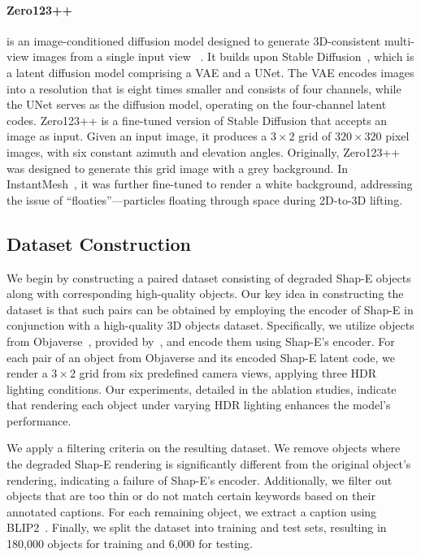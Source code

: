\paragraph{Zero123++}
is an image-conditioned diffusion model designed to generate 3D-consistent multi-view images from a single input view~\cite{shi2023zero123singleimageconsistent}
. It builds upon Stable Diffusion~\cite{rombach2022highresolutionimagesynthesislatent}, which is a latent diffusion model comprising a VAE and a UNet. The VAE encodes images into a resolution that is eight times smaller and consists of four channels, while the UNet serves as the diffusion model, operating on the four-channel latent codes.
Zero123++ is a fine-tuned version of Stable Diffusion that accepts an image as input. Given an input image, it produces a $3\times2$ grid of $320\times320$ pixel images, with six constant azimuth and elevation angles. 
Originally, Zero123++~\cite{shi2023zero123singleimageconsistent} was designed to generate this grid image with a grey background. In InstantMesh~\cite{xu2024instantmesh}, it was further fine-tuned to render a white background, addressing the issue of ``floaties''—particles floating through space during 2D-to-3D lifting.

\subsection{Dataset Construction} \label{sec:data}
We begin by constructing a paired dataset consisting of degraded Shap-E objects along with corresponding high-quality objects. Our key idea in constructing the dataset is that such pairs can be obtained by employing the encoder of Shap-E in conjunction with a high-quality 3D objects dataset.
Specifically, we utilize objects from Objaverse~\cite{deitke2023objaversexluniverse10m3d}, provided by~\cite{luo2023scalable, luo2024view}, and encode them using Shap-E's encoder. For each pair of an object from Objaverse and its encoded Shap-E latent code, we render a $3\times2$ grid from six predefined camera views, applying three HDR lighting conditions. Our experiments, detailed in the ablation studies, indicate that rendering each object under varying HDR lighting enhances the model’s performance.

We apply a filtering criteria on the resulting dataset.
We remove objects where the degraded Shap-E rendering is significantly different from the original object's rendering, indicating a failure of Shap-E's encoder. Additionally, we filter out objects that are too thin or do not match certain keywords based on their annotated captions. For each remaining object, we extract a caption using BLIP2~\cite{li2023blip2}.
Finally, we split the dataset into training and test sets, resulting in 180,000 objects for training and 6,000 for testing.


